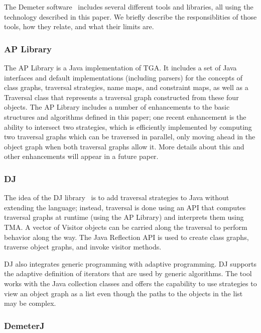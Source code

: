 The Demeter software~\cite{URL:demeter} includes several different
tools and libraries, all using the technology described in this paper.
We briefly describe the responsiblities of those tools, how they
relate, and what their limits are.

\subsubsection{AP Library}

The AP Library is a Java implementation of TGA.  It includes a set of
Java interfaces and default implementations (including parsers) for
the concepts of class graphs, traversal strategies, name maps, and
constraint maps, as well as a {\sf Traversal} class that represents a
traversal graph constructed from these four objects.  The AP Library
includes a number of enhancements to the basic structures and
algorithms defined in this paper; one recent enhancement is the
ability to intersect two strategies, which is efficiently implemented
by computing two traversal graphs which can be traversed in parallel,
only moving ahead in the object graph when both traversal graphs allow
it.  More details about this and other enhancements will appear in a
future paper.

\subsubsection{DJ}
\label{ssec-DJ}

The idea of the DJ library~\cite{OrleansLieberherrReflection01,
adaptive-methods-cacm-2001} is to add traversal strategies to
Java without extending the language; instead, traversal is done using
an API that computes traversal graphs at runtime (using the AP
Library) and interprets them using TMA.  A vector of {\sf Visitor}
objects can be carried along the traversal to perform behavior along
the way.  The Java Reflection API is used to create class graphs,
traverse object graphs, and invoke visitor methods.  

DJ also integrates generic programming with adaptive programming.  DJ
supports the adaptive definition of iterators that are used by generic
algorithms.  The tool works with the Java collection classes and
offers the capability to use strategies to view an object graph as
a list even though the paths to the objects in the list may be complex.

\subsubsection{DemeterJ}


